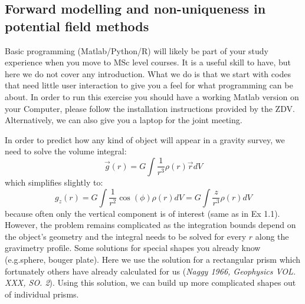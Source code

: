 \subsection{Forward modelling and non-uniqueness in potential field methods}
\begin{tcolorbox}[enhanced jigsaw,breakable,pad at break*=1mm,
  colback=blue!5!white,colframe=burgundy,title=Matlab (or Python),
  watermark color=white]
  Basic programming (Matlab/Python/R) will  likely be part of your study experience when you move to MSc level courses. It is a useful skill to have, but here we do not cover any introduction. What we do is that we start with codes that need  little user interaction to give you a feel for what programming can be about. In order to run this exercise you should have a working Matlab version on your Computer, please follow the installation instructions provided by the ZDV. Alternatively, we can also give you a laptop for the joint meeting.
\end{tcolorbox}
\label{Sec:GravityForwardModelling}
In order to predict how any kind of object will appear in a gravity survey, we need to solve the volume integral:
$$
 \vec{g}(r) = G\int \frac{1}{r^3} \rho(r) \vec{r} dV 
$$
which simplifies slightly to:
$$
 g_z(r) = G\int \frac{1}{r^2} \cos(\phi)\rho(r) dV = G\int \frac{z}{r^3} \rho(r) dV
$$
because often only the vertical component is of interest (same as in Ex 1.1).
However, the problem remains complicated as the integration bounds depend on the object's geometry and the integral needs to be solved for every $r$ along the gravimetry profile. Some solutions for special shapes you already know (e.g.sphere, bouger plate). Here we use the solution for a rectangular prism which fortunately others have already calculated for us (\textit{Naggy 1966, Geophysics VOL. XXX, SO. 2}). Using this solution, we can build up more complicated shapes out of individual prisms.

